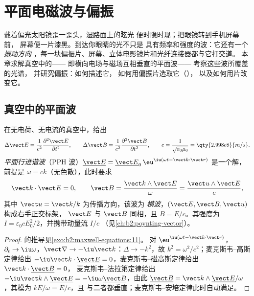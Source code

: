 \chapter{平面电磁波与偏振}\label{ch:b2:plane-waves-polarization}

戴着偏光太阳镜歪一歪头，湿路面上的眩光
便时隐时现；把眼镜转到手机屏幕前，
屏幕便一片漆黑。到达你眼睛的光不只是
具有频率和强度的波：它还有一个\emph{振动方向
}，每一块偏振片、屏幕、立体电影镜片和光纤连接器都与它打交道。
本章求解真空中的——
即横向电场与磁场互相垂直的平面波——
考察这些波所覆盖的光谱，
并研究偏振：如何描述它，
如何用偏振片选取它（），
以及如何用片改变它。

\section{真空中的平面波}

\begin{theorem}\label{thm:b2:plane-waves-polarization:wave}
在无电荷、无电流的真空中，给出
\[
\Delta\vect E = \frac1{c^2}\frac{\partial^2\vect E}{\partial t^2} , \qquad
\Delta\vect B = \frac1{c^2}\frac{\partial^2\vect B}{\partial t^2} , \qquad
c = \frac1{\sqrt{\varepsilon_0\mu_0}} = \qty{2.998e8}{m/s} .
\]
\emph{平面行进谐波}（PPH 波）$\underline{\vect E} =
\underline{\vect E}_0\,\eu^{\iu(\omega t - \vect k\cdot\vect r)}$ 是一个解，前提是
$\omega = ck$（无色散），此时要求
\[
\vect k\cdot\vect E = 0 , \qquad
\vect B = \frac{\vect k\wedge\vect E}\omega = \frac{\vect u\wedge\vect E}c ,
\]
其中 $\vect u = \vect k/k$ 为传播方向，该波为
\emph{横波}，$(\vect E, \vect B, \vect u)$ 构成右手正交标架，
$\vect E$ 与 $\vect B$ 同相，且 $B = E/c$。其强度为
$I = \varepsilon_0cE_0^2/2$，并携带动量流 $I/c$
（见\cref{ch:b2:poynting-vector}）。
\end{theorem}

\begin{proof}
的推导见\cref{exo:b2:maxwell-equations:11}。
对 $\eu^{\iu(\omega t - \vect k\cdot\vect r)}$，$\partial_t \to \iu\omega$，$\vect\nabla \to
-\iu\vect k$：$\Delta \to -k^2$，故 $k^2 = \omega^2/c^2$；麦克斯韦--高斯定律给出 $-\iu
\vect k\cdot\underline{\vect E} = 0$，麦克斯韦--磁高斯定律给出 $\vect k\cdot\underline{\vect B} = 0$，
麦克斯韦–法拉第定律给出 $-\iu\vect k\wedge\underline{\vect E} = -\iu\omega\underline{\vect B}$，由此
$\underline{\vect B} = \vect k\wedge\underline{\vect E}/\omega$，其模为 $kE/\omega = E/c$，且
与二者都垂直；麦克斯韦–安培定律此时自动满足。
\end{proof}

